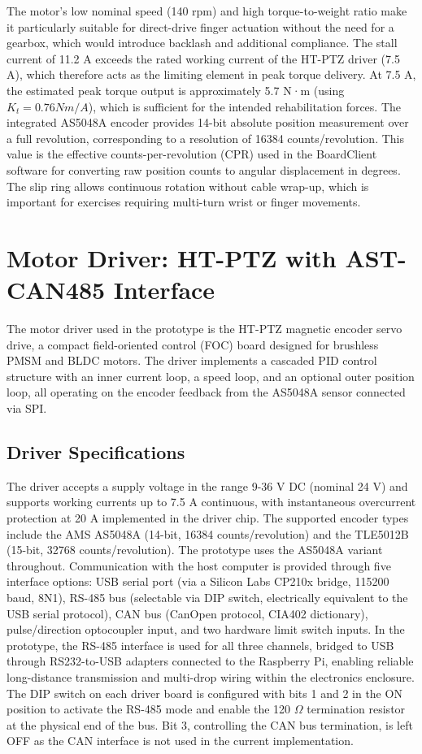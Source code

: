 The motor's low nominal speed (140 rpm) and high torque-to-weight ratio make it particularly suitable for direct-drive finger actuation without the need for a gearbox, which would introduce backlash and additional compliance. The stall current of 11.2 A exceeds the rated working current of the HT-PTZ driver (7.5 A), which therefore acts as the limiting element in peak torque delivery. At 7.5 A, the estimated peak torque output is approximately 5.7 N·m (using $K_t = 0.76 Nm/A$), which is sufficient for the intended rehabilitation forces.
The integrated AS5048A encoder provides 14-bit absolute position measurement over a full revolution, corresponding to a resolution of 16384 counts/revolution. This value is the effective counts-per-revolution (CPR) used in the BoardClient software for converting raw position counts to angular displacement in degrees. The slip ring allows continuous rotation without cable wrap-up, which is important for exercises requiring multi-turn wrist or finger movements.

\section{Motor Driver: HT-PTZ with AST-CAN485 Interface}
The motor driver used in the prototype is the HT-PTZ magnetic encoder servo drive, a compact field-oriented control (FOC) board designed for brushless PMSM and BLDC motors. The driver implements a cascaded PID control structure with an inner current loop, a speed loop, and an optional outer position loop, all operating on the encoder feedback from the AS5048A sensor connected via SPI.

\subsection{Driver Specifications}
The driver accepts a supply voltage in the range 9-36 V DC (nominal 24 V) and supports working currents up to 7.5 A continuous, with instantaneous overcurrent protection at 20 A implemented in the driver chip. The supported encoder types include the AMS AS5048A (14-bit, 16384 counts/revolution) and the TLE5012B (15-bit, 32768 counts/revolution). The prototype uses the AS5048A variant throughout.
Communication with the host computer is provided through five interface options: USB serial port (via a Silicon Labs CP210x bridge, 115200 baud, 8N1), RS-485 bus (selectable via DIP switch, electrically equivalent to the USB serial protocol), CAN bus (CanOpen protocol, CIA402 dictionary), pulse/direction optocoupler input, and two hardware limit switch inputs. In the prototype, the RS-485 interface is used for all three channels, bridged to USB through RS232-to-USB adapters connected to the Raspberry Pi, enabling reliable long-distance transmission and multi-drop wiring within the electronics enclosure.
The DIP switch on each driver board is configured with bits 1 and 2 in the ON position to activate the RS-485 mode and enable the 120 $\Omega$ termination resistor at the physical end of the bus. Bit 3, controlling the CAN bus termination, is left OFF as the CAN interface is not used in the current implementation.


